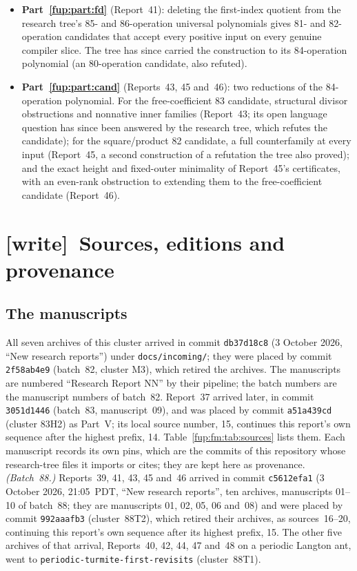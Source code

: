 \documentclass[11pt,letterpaper]{article}
\theoremstyle{definition}\newtheorem{definition}[theorem]{Definition}
\theoremstyle{remark}\newtheorem{remark}[theorem]{Remark}
\newcommand{\wtag}{\textup{[write]}}
\newcommand{\rw}[1]{\nolinkurl{#1}}%
\begin{document}
\begin{itemize}
\item \textbf{Part~\ref{fup:part:fd}} (Report~41): deleting the first-index quotient from the research tree's 85- and 86-operation universal polynomials gives 81- and 82-operation candidates that accept every positive input on every genuine compiler slice. The tree has since carried the construction to its 84-operation polynomial (an 80-operation candidate, also refuted).
\item \textbf{Part~\ref{fup:part:cand}} (Reports~43, 45 and~46): two reductions of the 84-operation polynomial. For the free-coefficient 83 candidate, structural divisor obstructions and nonnative inner families (Report~43; its open language question has since been answered by the research tree, which refutes the candidate); for the square/product 82 candidate, a full counterfamily at every input (Report~45, a second construction of a refutation the tree also proved); and the exact height and fixed-outer minimality of Report~45's certificates, with an even-rank obstruction to extending them to the free-coefficient candidate (Report~46).
\end{itemize}

\section{\wtag\ Sources, editions and provenance}\label{fup:fm:sec:provenance}
\subsection{The manuscripts}
All seven archives of this cluster arrived in commit \texttt{db37d18c8} (3 October 2026, ``New research reports'') under \rw{docs/incoming/}; they were placed by commit \texttt{2f58ab4e9} (batch~82, cluster M3), which retired the archives. The manuscripts are numbered ``Research Report NN'' by their pipeline; the batch numbers are the manuscript numbers of batch~82. Report~37 arrived later, in commit \texttt{3051d1446} (batch~83, manuscript~09), and was placed by commit \texttt{a51a439cd} (cluster 83H2) as Part~V; its local source number, 15, continues this report's own sequence after the highest prefix, 14. Table~\ref{fup:fm:tab:sources} lists them. Each manuscript records its own pins, which are the commits of this repository whose research-tree files it imports or cites; they are kept here as provenance. \emph{(Batch~88.)} Reports~39, 41, 43, 45 and~46 arrived in commit \texttt{c5612efa1} (3 October 2026, 21:05~PDT, ``New research reports'', ten archives, manuscripts 01--10 of batch~88; they are manuscripts 01, 02, 05, 06 and~08) and were placed by commit \texttt{992aaafb3} (cluster~88T2), which retired their archives, as sources~16--20, continuing this report's own sequence after its highest prefix, 15. The other five archives of that arrival, Reports~40, 42, 44, 47 and~48 on a periodic Langton ant, went to \rw{periodic-turmite-first-revisits} (cluster~88T1).
\end{document}
